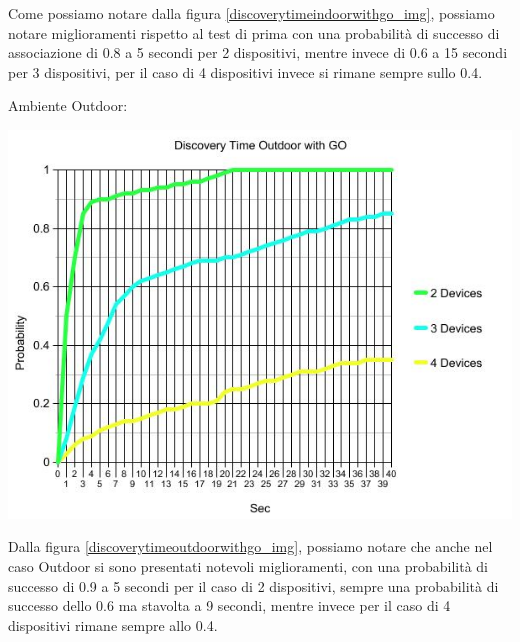 Come possiamo notare dalla figura \ref{discoverytimeindoorwithgo_img}, possiamo notare miglioramenti rispetto al test di prima con una probabilità di successo di associazione di 0.8 a 5 secondi per 2 dispositivi, mentre invece di 0.6 a 15 secondi per 3 dispositivi, per il caso di 4 dispositivi invece si rimane sempre sullo 0.4.
\newpage

Ambiente Outdoor:
\begin{center}
\includegraphics[width=1\textwidth]{imgs/Discovery_Time_Outdoor_with_GO.jpg}
\label{discoverytimeoutdoorwithgo_img}%
\end{center}

Dalla figura \ref{discoverytimeoutdoorwithgo_img}, possiamo notare che anche nel caso Outdoor si sono presentati notevoli miglioramenti, con una probabilità di successo di 0.9 a 5 secondi per il caso di 2 dispositivi, sempre una probabilità di successo dello 0.6 ma stavolta a 9 secondi, mentre invece per il caso di 4 dispositivi rimane sempre allo 0.4.
\newpage

